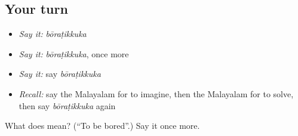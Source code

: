 \subsection*{Your turn}
\begin{itemize}
\raggedright
  \item \emph{Say it:} \emph{bōraṭikkuka}
  \item \emph{Say it:} \emph{bōraṭikkuka}, once more
  \item \emph{Say it:} say \emph{bōraṭikkuka}
  \item \emph{Recall:} say the Malayalam for to imagine, then the Malayalam for to solve, then say \emph{bōraṭikkuka} again
\end{itemize}

\begin{tcolorbox}[breakable,colback=teal!4,colframe=teal!35!black,title={Before you move on}]
What does  mean? (\textquotedblleft{}To be bored\textquotedblright{}.) Say it once more.
\end{tcolorbox}
